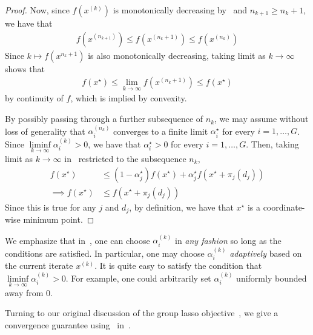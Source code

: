 \begin{proof}
Now, since $f(x^{(k)})$ is monotonically decreasing by~
and $n_{k+1} \geq n_k+1$,
we have that
\begin{align*}
    f(x^{(n_{k+1})}) \leq f(x^{(n_k+1)}) \leq f(x^{(n_k)})
\end{align*}
Since $k\mapsto f(x^{n_k+1})$ is also monotonically decreasing,
taking limit as $k\to\infty$ shows that
\begin{align*}
    f(x^\star) \leq \lim\limits_{k\to\infty} f(x^{(n_k+1)}) \leq f(x^\star)
\end{align*}
by continuity of $f$, which is implied by convexity.

By possibly passing through a further subsequence of $n_k$,
we may assume without loss of generality that $\alpha_i^{(n_k)}$ converges
to a finite limit $\alpha_i^\star$ for every $i=1,\ldots, G$.
Since $\liminf\limits_{k\to\infty} \alpha_i^{(k)} > 0$,
we have that $\alpha_i^\star > 0$ for every $i=1,\ldots, G$.
Then, taking limit as $k\to\infty$ in~
restricted to the subsequence $n_k$,
\begin{align*}
    f(x^\star)
    &\leq 
    (1-\alpha_j^\star) f(x^\star)
    + \alpha_j^\star f(x^\star + \pi_j(d_j))
    \\ \implies
    f(x^\star)
    &\leq
    f(x^\star + \pi_j(d_j))
\end{align*}
Since this is true for any $j$ and $d_j$,
by definition, we have that $x^\star$ is a coordinate-wise minimum point.
\end{proof}

We emphasize that in~,
one can choose $\alpha_i^{(k)}$ 
in \emph{any fashion} so long as the conditions are satisfied.
In particular, one may choose $\alpha_i^{(k)}$ \emph{adaptively} based on the current iterate $x^{(k)}$.
It is quite easy to satisfy the condition that $\liminf\limits_{k\to\infty} \alpha_i^{(k)} > 0$.
For example, one could arbitrarily set $\alpha_i^{(k)}$ uniformly bounded away from $0$.

Turning to our original discussion of the group lasso objective~,
we give a convergence guarantee using~ in~. 

